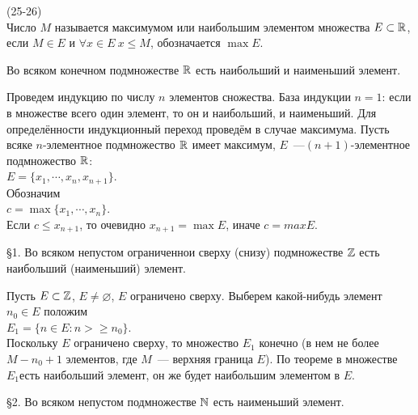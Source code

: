 (25-26)\\
Число $M$ называется максимумом или наибольшим элементом множества $E \subset \mathbb{R}$, если $M \in E$ и $\forall x \in E\ x \le M$, обозначается $\max E$.

\T Во всяком конечном подмножестве $\mathbb{R}$ есть наибольший и наименьший элемент.

\D Проведем индукцию по числу $n$ элементов сножества. База индукции $n = 1$: если в множестве всего один элемент, то он и наибольший, и наименьший. Для определённости индукционный переход проведём в случае максимума. Пусть всяке $n$-элементное подмножество $\mathbb{R}$ имеет максимум, $E$~---$(n + 1)$-элементное подмножество $\mathbb{R}$:\\
$E = \{x_1, \cdots, x_n, x_{n + 1}\}$.\\
Обозначим\\
$c = \max\{x_1, \cdots, x_n\}$.\\
Если $c \le x_{n + 1}$, то очевидно $x_{n + 1} = \max E$, иначе $c = max E$.

\S1. Во всяком непустом ограниченнои сверху (снизу) подмножестве $\mathbb{Z}$ есть наибольший (наименьший) элемент.

\D Пусть $E \subset \mathbb{Z}$, $E \neq \varnothing$, $E$ ограничено сверху. Выберем какой-нибудь элемент $n_0 \in E$ положим\\
$E_1 = \{n \in E: n >\ge n_0\}$.\\
Поскольку $E$ ограничено сверху, то множество $E_1$ конечно (в нем не более $M - n_0 + 1$ элементов, где $M$~--- верхняя граница $E$). По теореме в множестве $E_1$есть наибольший элемент, он же будет наибольшим элементом в $E$.

\S2. Во всяком непустом подмножестве $\mathbb{N}$ есть наименьший элемент.


